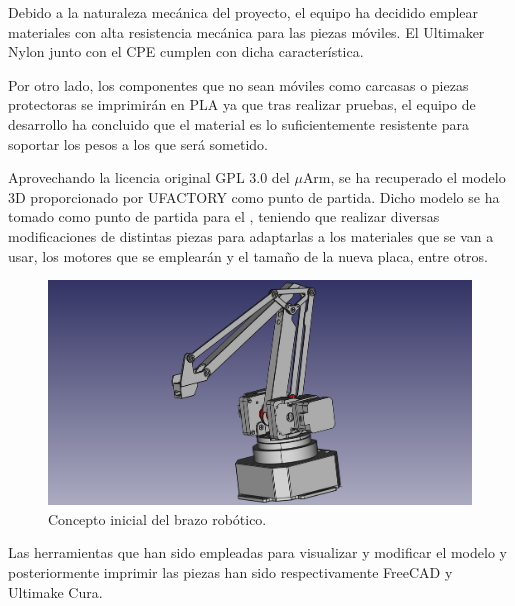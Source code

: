 Debido a la naturaleza mecánica del proyecto, el equipo ha decidido emplear materiales con alta resistencia mecánica para las piezas móviles. El Ultimaker Nylon junto con el CPE cumplen con dicha característica.

Por otro lado, los componentes que no sean móviles como carcasas o  
piezas protectoras se imprimirán en PLA ya que tras realizar pruebas, el equipo de desarrollo ha concluido que el material es lo suficientemente resistente para soportar los pesos a los que será sometido.

Aprovechando la licencia original GPL 3.0 del $\mu$Arm, se ha recuperado el modelo 3D proporcionado por UFACTORY como punto de partida. 
Dicho modelo se ha tomado como punto de partida para el \pArm{}, teniendo que realizar diversas
modificaciones de distintas piezas para adaptarlas a los materiales que se van a usar,
los motores que se emplearán y el tamaño de la nueva placa, entre otros.

\begin{figure}[H]
    \centering
    \includegraphics[width=.8\linewidth]{pictures/brazo_vista_3d_inicial.png}
    \caption{Concepto inicial del brazo robótico.}
    \label{fig:manipulador_inicial}
\end{figure}

Las herramientas que han sido empleadas para visualizar y modificar el modelo y posteriormente imprimir las piezas han sido respectivamente FreeCAD y Ultimake Cura.

